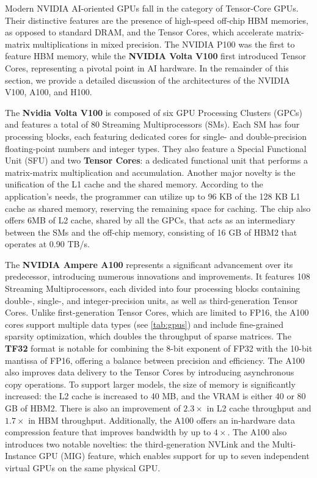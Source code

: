 Modern NVIDIA AI-oriented GPUs fall in the category of Tensor-Core GPUs. Their distinctive features are the presence of high-speed off-chip HBM memories, as opposed to standard DRAM, and the Tensor Cores, which accelerate matrix-matrix multiplications in mixed precision.
The NVIDIA P100 was the first to feature HBM memory, while the \textbf{NVIDIA Volta V100} \cite{choquette2018volta} first introduced Tensor Cores, representing a pivotal point in AI hardware.
In the remainder of this section, we provide a detailed discussion of the architectures of the NVIDIA V100, A100, and H100.

The \textbf{Nvidia Volta V100} is composed of six GPU Processing Clusters (GPCs) and features a total of 80 Streaming Multiprocessors (SMs). Each SM has four processing blocks, each featuring dedicated cores for single- and double-precision floating-point numbers and integer types. They also feature a Special Functional Unit (SFU) and two \textbf{Tensor Cores}: a dedicated functional unit that performs a matrix-matrix multiplication and accumulation.
Another major novelty is the unification of the L1 cache and the shared memory. According to the application's needs, the programmer can utilize up to 96 KB of the 128 KB L1 cache as shared memory, reserving the remaining space for caching.
The chip also offers 6MB of L2 cache, shared by all the GPCs, that acts as an intermediary between the SMs and the off-chip memory, consisting of 16 GB of HBM2 that operates at 0.90 TB/s.

The \textbf{NVIDIA Ampere A100} \cite{Choquette2021} represents a significant advancement over its predecessor, introducing numerous innovations and improvements.
It features 108 Streaming Multiprocessors, each divided into four processing blocks containing double-, single-, and integer-precision units, as well as third-generation Tensor Cores.
Unlike first-generation Tensor Cores, which are limited to FP16, the A100 cores support multiple data types (see \ref{tab:gpus}) and include fine-grained sparsity optimization, which doubles the throughput of sparse matrices. The \textbf{TF32} format is notable for combining the 8-bit exponent of FP32 with the 10-bit mantissa of FP16, offering a balance between precision and efficiency. The A100 also improves data delivery to the Tensor Cores by introducing asynchronous copy operations.
To support larger models, the size of memory is significantly increased: the L2 cache is increased to 40 MB, and the VRAM is either 40 or 80 GB of HBM2. There is also an improvement of $2.3\times$ in L2 cache throughput and $1.7\times$ in HBM throughput. Additionally, the A100 offers an in-hardware data compression feature that improves bandwidth by up to $4\times$.
The A100 also introduces two notable novelties: the third-generation NVLink and the Multi-Instance GPU (MIG) feature, which enables support for up to seven independent virtual GPUs on the same physical GPU.

